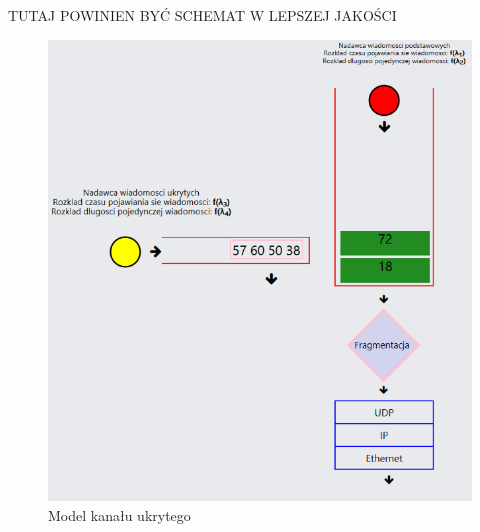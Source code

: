 \documentclass[a4paper, twoside, 12pt]{report}
\begin{document}
    TUTAJ POWINIEN BYĆ SCHEMAT W LEPSZEJ JAKOŚCI

    \begin{figure}[h]
            \centering
            \includegraphics[scale=0.99]{hidden_channel_model}
            \caption{Model kanału ukrytego}
            \label{HIDDENCHANNELMODEL}
    \end{figure}
\end{document}

